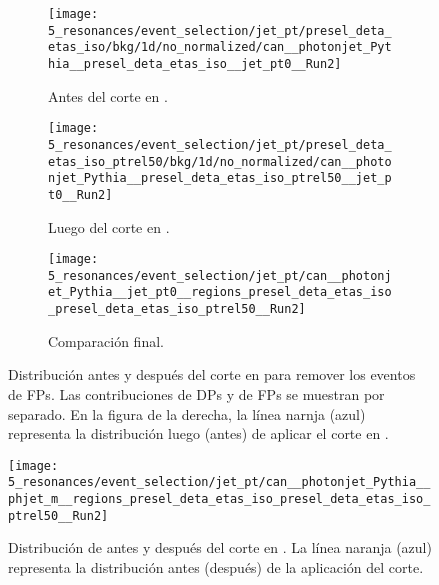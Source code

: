 \begin{figure}[ht!]
    \centering
    \begin{subfigure}[h]{0.32\linewidth}
        \centering
        \texttt{[image: 5\_resonances/event\_selection/jet\_pt/presel\_deta\_etas\_iso/bkg/1d/no\_normalized/can\_\_photonjet\_Pythia\_\_presel\_deta\_etas\_iso\_\_jet\_pt0\_\_Run2]}
        \caption{Antes del corte en \ptjet.}
    \end{subfigure}
    \hfill
    \begin{subfigure}[h]{0.32\linewidth}
        \centering
        \texttt{[image: 5\_resonances/event\_selection/jet\_pt/presel\_deta\_etas\_iso\_ptrel50/bkg/1d/no\_normalized/can\_\_photonjet\_Pythia\_\_presel\_deta\_etas\_iso\_ptrel50\_\_jet\_pt0\_\_Run2]}
        \caption{Luego del corte en \ptjet.}
    \end{subfigure}
    \hfill
    \begin{subfigure}[h]{0.32\linewidth}
        \centering
        \texttt{[image: 5\_resonances/event\_selection/jet\_pt/can\_\_photonjet\_Pythia\_\_jet\_pt0\_\_regions\_presel\_deta\_etas\_iso\_presel\_deta\_etas\_iso\_ptrel50\_\_Run2]}
        \caption{Comparación final.}
    \end{subfigure}
    \caption{Distribución antes y después del corte en \ptjet para remover los eventos de \acp{FP}. Las contribuciones de \acp{DP} y de \acp{FP} se muestran por separado. En la figura de la derecha, la l\'inea narnja (azul) representa la distribución luego (antes) de aplicar el corte en \ptjet.}
    \label{fig:evt_selection:sr_opt:jet_pt:jet_pt}
\end{figure}



\begin{figure}[ht!]
    \centering
    \texttt{[image: 5\_resonances/event\_selection/jet\_pt/can\_\_photonjet\_Pythia\_\_phjet\_m\_\_regions\_presel\_deta\_etas\_iso\_presel\_deta\_etas\_iso\_ptrel50\_\_Run2]}
    \caption{Distribución de \myj antes y después del corte en \ptjet. La l\'inea naranja (azul) representa la distribución antes (después) de la aplicación del corte.}
    \label{fig:evt_selection:sr_opt:jet_pt:phjet_m}
\end{figure}
















